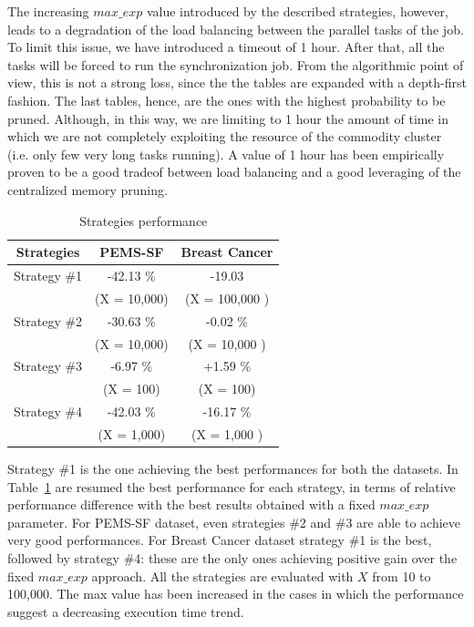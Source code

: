 The increasing $max\_exp$ value introduced by the described strategies, however, leads to a degradation of the load balancing between the parallel tasks of the job. To limit this issue, we have introduced a timeout of 1 hour. After that, all the tasks will be forced to run the synchronization job. From the algorithmic point of view, this is not a strong loss, since the the tables are expanded with a depth-first fashion. The last tables, hence, are the ones with the highest probability to be pruned. Although, in this way, we are limiting to 1 hour the amount of time in which we are not completely exploiting the resource of the commodity cluster (i.e. only few very long tasks running). A value of 1 hour has been empirically proven to be a good tradeof between load balancing and a good leveraging of the centralized memory pruning.



\begin{table}
\begin{center}
\caption{Strategies performance}
\label{strategies_perf}
\begin{tabular}{ |c| c | c| }
\hline
 Strategies & PEMS-SF& Breast Cancer   \\ \hline
  Strategy \#1 &-42.13 \%   &    -19.03 \\ 
   &
 (X = 10,000)  &   (X = 100,000 )   \\ \hline
  Strategy \#2 & -30.63 \% &  -0.02 \%   \\ 
      & (X = 10,000)&  (X = 10,000 )    \\ \hline
  Strategy \#3 & -6.97 \%  & +1.59 \%   \\ 
      &  (X = 100)&  (X = 100)   \\ \hline
   Strategy \#4 & -42.03 \%
 &  -16.17 \%   \\ 
      &(X = 1,000) & (X = 1,000 )    \\ \hline
\end{tabular}
\end{center}
\end{table}

Strategy \#1 is the one achieving the best performances for both the datasets. In Table~\ref{strategies_perf} are resumed the best performance for each strategy, in terms of relative performance difference with the best results obtained with a fixed $max\_exp$ parameter. For PEMS-SF dataset, even strategies \#2 and \#3 are able to achieve very good performances. For Breast Cancer dataset strategy \#1 is the best, followed by strategy \#4: these are the only ones achieving positive gain over the fixed $max\_exp$ approach.
All the strategies are evaluated with $X$ from 10 to 100,000. The max value has been increased in the cases in which the performance suggest a decreasing execution time trend.

